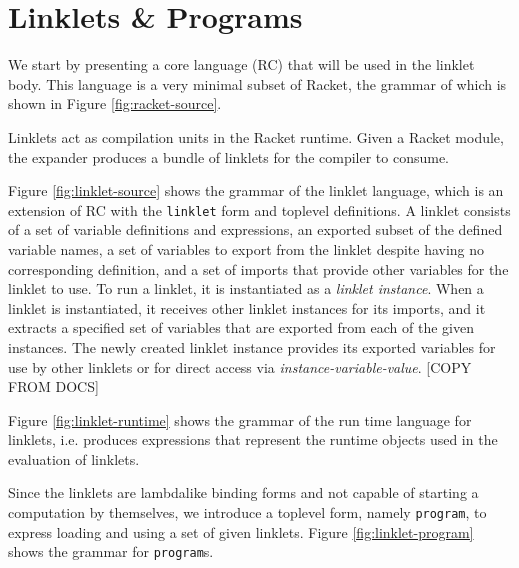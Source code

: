 \documentclass[sigplan,screen,anonymous]{acmart}
\def\dash {\text{-}}
\begin{document}


\section{Linklets \& Programs}

We start by presenting a core language (RC) that will be used in the
linklet body. This language is a very minimal subset of Racket, the
grammar of which is shown in Figure \ref{fig:racket-source}.

Linklets act as compilation units in the Racket runtime. Given a
Racket module, the expander produces a bundle of linklets for the
compiler to consume.

Figure \ref{fig:linklet-source} shows the grammar of the linklet
language, which is an extension of RC with the \verb|linklet| form and
toplevel definitions. A linklet consists of a set of variable
definitions and expressions, an exported subset of the defined
variable names, a set of variables to export from the linklet despite
having no corresponding definition, and a set of imports that provide
other variables for the linklet to use. To run a linklet, it is
instantiated as a {\it linklet instance}. When a linklet is
instantiated, it receives other linklet instances for its imports, and
it extracts a specified set of variables that are exported from each
of the given instances. The newly created linklet instance provides
its exported variables for use by other linklets or for direct access
via {\it instance-variable-value}. [COPY FROM DOCS]

Figure \ref{fig:linklet-runtime} shows the grammar of the run\dash
time language for linklets, i.e. produces expressions that represent
the run\dash time objects used in the evaluation of linklets.

Since the linklets are lambda\dash like binding forms and not capable
of starting a computation by themselves, we introduce a top\dash level
form, namely \verb|program|, to express loading and using a set of
given linklets. Figure \ref{fig:linklet-program} shows the grammar for
\verb|program|s. 

\newpage
\end{document}
